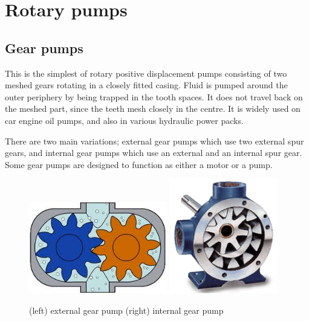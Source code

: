 \clearpage


\section{Rotary pumps}

\subsection{Gear pumps}
This is the simplest of rotary positive displacement pumps consisting of two meshed gears rotating in a closely fitted casing. Fluid is pumped around the outer periphery by being trapped in the tooth spaces. It does not travel back on the meshed part, since the teeth mesh closely in the centre. It is widely used on car engine oil pumps, and also in various hydraulic power packs.

There are two main variations; external gear pumps which use two external spur gears, and internal gear pumps which use an external and an internal spur gear. Some gear pumps are designed to function as either a motor or a pump.

\begin{figure}[h!]
\begin{center}
\includegraphics[height=4cm]{figs/gear_pump.jpg}
\hspace{1cm}
\includegraphics[height=5cm]{figs/genpur.png}
\caption{\label{fig:gear_pumps} (left) external gear pump (right) internal gear pump}
\end{center}
\end{figure}

